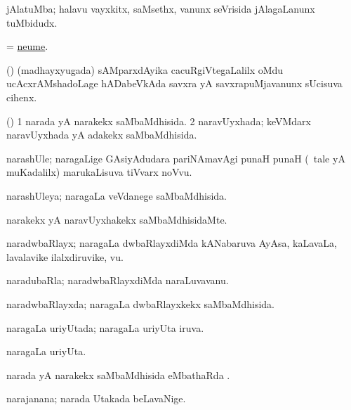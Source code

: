 \bentry
{}
\gl{\nA}
\bmng
jAlatuMba; halavu vayxkitx, saMsethx, \mo vanunx seVrisida jAlagaLanunx tuMbidudx. 
\emng
\eentry

\bentry
{}
\gl{\nA}
\bmng
= \hyperlink{neume}{neume}. 
\emng
\eentry

\bentry
{}
\gl{\nA}
\bmng
(\saM) (madhayxyugada) sAMparxdAyika cacuRgiVtegaLalilx oMdu ucAcxrAMshadoLage hADabeVkAda savxra yA savxrapuMjavanunx sUcisuva cihenx. 
\emng
\eentry

\bentry
{}
\gl{\gu}
\bmng
(\aMrashA) 
\bnum
\num{1} narada yA narakekx saMbaMdhisida. 
\num{2} naravUyxhada; keVMdarx naravUyxhada yA adakekx saMbaMdhisida. 
\enum
\emng
\eentry

\bentry
{}
\gl{\nA}
\bmng
narashUle; naragaLige GAsiyAdudara pariNAmavAgi punaH punaH (\kanmu\ tale yA muKadalilx) marukaLisuva tiVvarx noVvu. 
\emng
\eentry

\bentry
{}
\gl{\gu}
\bmng
narashUleya; naragaLa veVdanege saMbaMdhisida. 
\emng
\eentry

\bentry
{}
\gl{\kirxvi}
\bmng
narakekx yA naravUyxhakekx saMbaMdhisidaMte. 
\emng
\eentry

\bentry
{}
\gl{\nA}
\bmng
naradwbaRlayx; naragaLa dwbaRlayxdiMda kANabaruva AyAsa, kaLavaLa, lavalavike ilalxdiruvike, \mo vu. 
\emng
\eentry

\bentry
{}
\gl{\nA}
\bmng
naradubaRla; naradwbaRlayxdiMda naraLuvavanu. 
\emng
\eentry

\bentry
{}
\gl{\gu}
\bmng
naradwbaRlayxda; naragaLa dwbaRlayxkekx saMbaMdhisida. 
\emng
\eentry

\bentry
{}
\gl{\gu}
\bmng
naragaLa uriyUtada; naragaLa uriyUta iruva. 
\emng
\eentry

\bentry
{}
\gl{\nA}
\bmng
naragaLa uriyUta. 
\emng
\eentry

\bentry
{}
\gl{\sapUpa}
\bmng
narada yA narakekx saMbaMdhisida eMbathaRda \sapUpa. 
\emng
\eentry

\bentry
{}
\gl{\nA}
\bmng
narajanana; narada Utakada beLavaNige. 
\emng
\eentry

